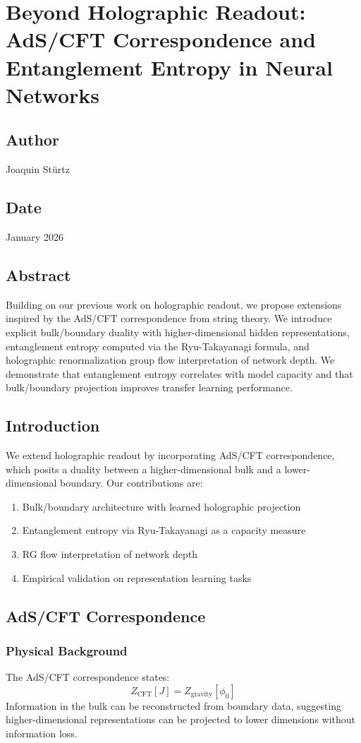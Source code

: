 \documentclass{article}
\numberwithin{equation}{section}
\begin{document}
\section{Beyond Holographic Readout: AdS/CFT Correspondence and Entanglement Entropy in Neural Networks}
\subsection*{Author}
Joaquin Stürtz
\subsection*{Date}
January 2026
\subsection*{Abstract}
Building on our previous work on holographic readout, we propose extensions inspired by the AdS/CFT correspondence from string theory. We introduce explicit bulk/boundary duality with higher-dimensional hidden representations, entanglement entropy computed via the Ryu-Takayanagi formula, and holographic renormalization group flow interpretation of network depth. We demonstrate that entanglement entropy correlates with model capacity and that bulk/boundary projection improves transfer learning performance.

\subsection{Introduction}
We extend holographic readout by incorporating AdS/CFT correspondence, which posits a duality between a higher-dimensional bulk and a lower-dimensional boundary. Our contributions are:
\begin{enumerate}
\item Bulk/boundary architecture with learned holographic projection
\item Entanglement entropy via Ryu-Takayanagi as a capacity measure
\item RG flow interpretation of network depth
\item Empirical validation on representation learning tasks
\end{enumerate}

\subsection{AdS/CFT Correspondence}
\subsubsection{Physical Background}
The AdS/CFT correspondence states:
\[
Z_{\text{CFT}}[J] = Z_{\text{gravity}}[\phi_0]
\]
Information in the bulk can be reconstructed from boundary data, suggesting higher-dimensional representations can be projected to lower dimensions without information loss.
\end{document}
